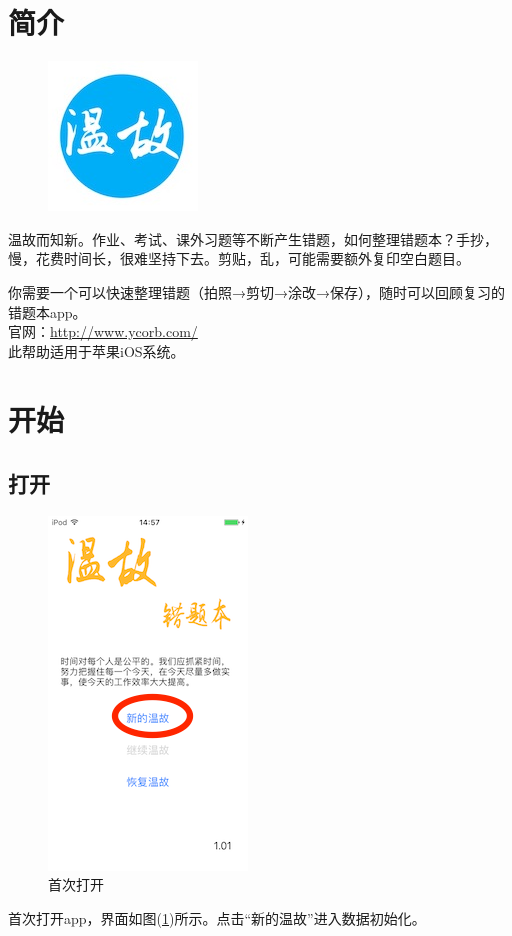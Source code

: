 \section{简介}

\begin{figure}[H]
\centering
\includegraphics{img/logo.jpg}
\end{figure}
温故而知新。作业、考试、课外习题等不断产生错题，如何整理错题本？手抄，慢，花费时间长，很难坚持下去。剪贴，乱，可能需要额外复印空白题目。

你需要一个可以快速整理错题（拍照→剪切→涂改→保存），随时可以回顾复习的错题本app。\\

官网：\url{http://www.ycorb.com/}\\

此帮助适用于苹果iOS系统。


\section{开始}
\subsection{打开}
\begin{figure}[H]
	\centering
	\includegraphics{img/1.png}
	\caption{首次打开}
	\label{img1}
\end{figure}
首次打开app，界面如图(\ref{img1})所示。点击“新的温故”进入数据初始化。

